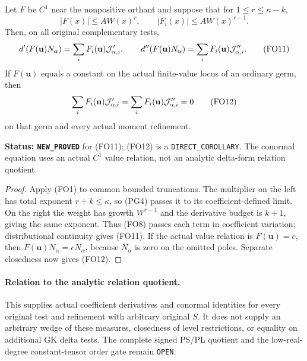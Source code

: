 \begin{theorem}
\label{thm:r11-unbounded-first-order-chain}
Let $F$ be $C^1$ near the nonpositive orthant and suppose
that for $1\leq r\leq\kappa-k$,
\[
 |F(x)|\leq A W(x)^r,\qquad
 |F_i(x)|\leq A W(x)^{r-1}.
 \tag{FO10}
\]
Then, on all original complementary tests,
\[
 d'(F(\mathbf u)N_\alpha)
                  =\sum_iF_i(\mathbf u){\cal J}'_{\alpha,i},
 \qquad
 d''(F(\mathbf u)N_\alpha)
                  =\sum_iF_i(\mathbf u){\cal J}''_{\alpha,i}.
 \tag{FO11}
\]
If $F(\mathbf u)$ equals a constant on the actual
finite-value locus of an ordinary germ, then
\[
       \sum_iF_i(\mathbf u){\cal J}'_{\alpha,i}
       =\sum_iF_i(\mathbf u){\cal J}''_{\alpha,i}=0
 \tag{FO12}
\]
on that germ and every actual moment refinement.
\end{theorem}

\noindent\textbf{Status: \texttt{NEW\_PROVED}} for
(FO11); (FO12) is a \texttt{DIRECT\_COROLLARY}.
The conormal equation uses an actual $C^1$ value
relation, not an analytic delta-form relation quotient.

\begin{proof}
Apply (FO1) to common bounded truncations. The multiplier
on the left has total exponent $r+k\leq\kappa$, so
(PG4) passes it to its coefficient-defined limit.
On the right the weight has growth $W^{r-1}$ and the
derivative budget is $k+1$, giving the same exponent.
Thus (FO8) passes each term in coefficient variation;
distributional continuity gives (FO11).
If the actual value relation is $F(\mathbf u)=c$,
then $F(\mathbf u)N_\alpha=cN_\alpha$, because
$N_\alpha$ is zero on the omitted poles.
Separate closedness now gives (FO12).
\end{proof}

\paragraph{Relation to the analytic relation quotient.}
This supplies actual coefficient derivatives and conormal
identities for every original test and refinement with
arbitrary original $S$. It does not supply an arbitrary
wedge of these measures, closedness of level restrictions,
or equality on additional GK delta tests. The complete
signed PS/PL quotient and the low-real-degree constant-tensor
order gate remain \texttt{OPEN}.
